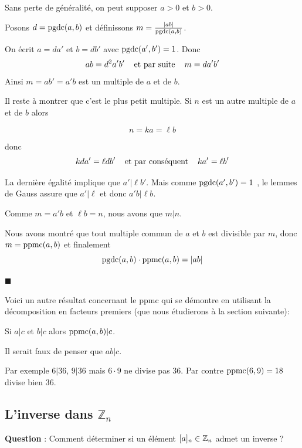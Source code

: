 \begin{demonstration}
Sans perte de généralité, on peut supposer $a>0$ et $b>0$.

\smallskip
Posons $d= \pgdc(a,b)$ et définissons $m= \frac{|ab|}{\pgdc(a,b)}$.

\bigskip
On écrit $a=da'$ et $b=db'$ avec $\pgdc(a',b')=1$. Donc 
$$ab=d^2 a'b'\eh{4}\textrm{et par suite}\eh{4}m=da'b'$$
Ainsi $m=ab'=a'b$ est un multiple de $a$ et de $b$.

\medskip
Il reste à montrer que c'est le plus petit multiple. Si $n$ est un autre multiple
de $a$ et de $b$ alors 

$$n= ka= \ell b$$

donc $$kda'=\ell d b' \eh{4}\textrm{et par conséquent}\eh{4} ka'=\ell b'$$

La dernière égalité implique que $a' | \ell b'$. Mais comme $\pgdc(a',b')=1$ , le lemmes de Gauss assure que $a'|\ell$ et donc $a'b | \ell b$.

\medskip
Comme $m=a'b$ et $\ell b = n$, nous avons que $m|n$.

\medskip
Nous avons montré que tout multiple commun de $a$ et $b$ est divisible par $m$, donc $m=\ppmc(a,b)$ et finalement 
$$\pgdc(a,b) \cdot  \ppmc(a,b) = |ab|$$

\vspace{-3mm}\hfill $\blacksquare$
 
\end{demonstration}

Voici un autre résultat concernant le ppmc qui se démontre en utilisant la décomposition en facteurs premiers (que nous étudierons à la section suivante):
\begin{proposition}
Si $a|c$ et $b|c$ alors $\ppmc(a,b)|c$.
\end{proposition}

\begin{remarque}
Il serait faux de penser que $ab|c$.

\smallskip
Par exemple $6|36$, $9|36$ mais $6\cdot 9$ ne divise pas $36$.
Par contre $\ppmc(6,9)=18$ divise bien $36$.
\end{remarque}


\subsection*{L'inverse dans $\mathbb{Z}_n$}
\textbf{Question} : Comment déterminer si un élément $\cl{a} \in  \mathbb{Z}_n$ admet un inverse ? \\

